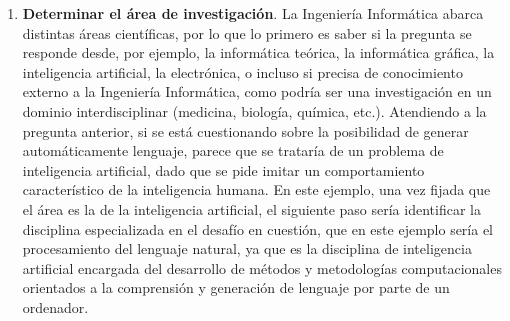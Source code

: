 \begin{enumerate}
    \item \textbf{Determinar el área de investigación}. La Ingeniería Informática abarca distintas áreas científicas, por lo que lo primero es saber si la pregunta se responde desde, por ejemplo, la informática teórica, la informática gráfica, la inteligencia artificial, la electrónica, o incluso si precisa de conocimiento externo a la Ingeniería Informática, como podría ser una investigación en un dominio interdisciplinar (medicina, biología, química, etc.). Atendiendo a la pregunta anterior, si se está cuestionando sobre la posibilidad de generar automáticamente lenguaje, parece que se trataría de un problema de inteligencia artificial, dado que se pide imitar un comportamiento característico de la inteligencia humana. En este ejemplo, una vez fijada que el área es la de la inteligencia artificial, el siguiente paso sería identificar la disciplina especializada en el desafío en cuestión, que en este ejemplo sería el procesamiento del lenguaje natural, ya que es la disciplina de inteligencia artificial encargada del desarrollo de métodos y metodologías computacionales orientados a la comprensión y generación de lenguaje por parte de un ordenador.


\end{enumerate}
